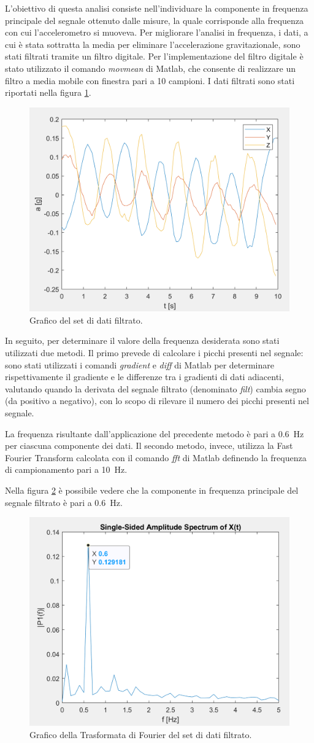 L'obiettivo di questa analisi consiste nell'individuare la componente in frequenza principale del segnale ottenuto dalle misure, la quale corrisponde alla frequenza con cui l'accelerometro si muoveva. Per migliorare l'analisi in frequenza, i dati, a cui è stata sottratta la media per eliminare l'accelerazione gravitazionale, sono stati filtrati tramite un filtro digitale. Per l'implementazione del filtro digitale è stato utilizzato il comando \textit{movmean} di Matlab, che consente di realizzare un filtro a media mobile con finestra pari a 10 campioni. I dati filtrati sono stati riportati nella figura \ref{fig:plot_dati_filt}.
\begin{figure}[h]
	\centering		
	\includegraphics[width=0.6\linewidth]{./ImageFiles/plot1filt_arr2.png}
	\caption{Grafico del set di dati filtrato.}
	\label{fig:plot_dati_filt}
\end{figure}
\newpage
In seguito, per determinare il valore della frequenza desiderata sono stati utilizzati due metodi. Il primo prevede di calcolare i picchi presenti nel segnale: sono stati utilizzati i comandi \textit{gradient} e \textit{diff} di Matlab per determinare rispettivamente il gradiente e le differenze tra i gradienti di dati adiacenti, valutando quando la derivata del segnale filtrato (denominato \textit{filt}) cambia segno (da positivo a negativo), con lo scopo di rilevare il numero dei picchi presenti nel segnale.

La frequenza risultante dall'applicazione del precedente metodo è pari a \SI{0.6}{\hertz} per ciascuna componente dei dati.
Il secondo metodo, invece, utilizza la Fast Fourier Transform calcolata con il comando \textit{fft} di Matlab definendo la frequenza di campionamento pari a \SI{10}{\hertz}.

Nella figura \ref{fig:plot_fft} è possibile vedere che la componente in frequenza principale del segnale filtrato è pari a \SI{0.6}{\hertz}.
\begin{figure}[tbh]
	\centering		
	\includegraphics[width=0.6\linewidth]{./ImageFiles/plot2_arr2.png}
	\caption{Grafico della Trasformata di Fourier del set di dati filtrato.}
	\label{fig:plot_fft}
\end{figure}
